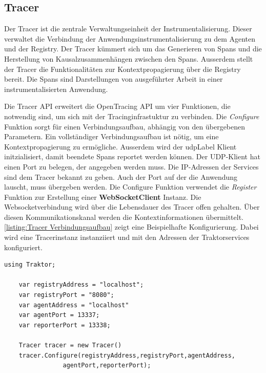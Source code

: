 \subsection{Tracer}
\label{subsection:Tracer}
Der Tracer ist die zentrale Verwaltungseinheit der Instrumentalisierung. Dieser verwaltet die Verbindung der Anwendungsinstrumentalisierung zu dem Agenten und der Registry. Der Tracer kümmert sich um das Generieren von Spans und die Herstellung von Kausalzusammenhängen zwischen den Spans. Ausserdem stellt der Tracer die Funktionalitäten zur Kontextpropagierung über die Registry bereit. Die Spans sind Darstellungen von ausgeführter Arbeit in einer instrumentalisierten Anwendung. 

Die Tracer API erweitert die OpenTracing API um vier Funktionen, die notwendig sind, um sich mit der Tracinginfrastuktur zu verbinden. Die \emph{Configure} Funktion sorgt für einen Verbindungsaufbau, abhängig von den übergebenen Parametern. Ein vollständiger Verbindungsaufbau ist nötig, um eine Kontextpropagierung zu ermögliche. Ausserdem wird der \gls{udpLabel} Klient initzialisiert, damit beendete Spans reportet werden können. Der UDP-Klient hat einen Port zu belegen, der angegeben werden muss. Die IP-Adressen der Services sind dem Tracer bekannt zu geben. Auch der Port auf der die Anwendung lauscht, muss übergeben werden. Die Configure Funktion verwendet die \emph{Register} Funktion zur Erstellung einer \textbf{WebSocketClient} Instanz. Die Websocketverbindung wird über die Lebensdauer des Tracer offen gehalten. Über diesen Kommunikationskanal werden die Kontextinformationen übermittelt. \cref{listing:Tracer Verbindungsaufbau} zeigt eine Beispielhafte Konfigurierung. Dabei wird eine Tracerinstanz instanziiert und mit den Adressen der Traktorservices konfiguriert.

\begin{minipage}[]{\textwidth}
	\begin{lstlisting}[frame=trBL]
	using Traktor;
	
	var registryAddress = "localhost";
	var registryPort = "8080";
	var agentAddress = "localhost"
	var agentPort = 13337;
	var reporterPort = 13338;
	
	Tracer tracer = new Tracer()
	tracer.Configure(registryAddress,registryPort,agentAddress,
				agentPort,reporterPort);
	
	\end{lstlisting}
	\label{listing:Tracer Verbindungsaufbau}
\end{minipage} 

